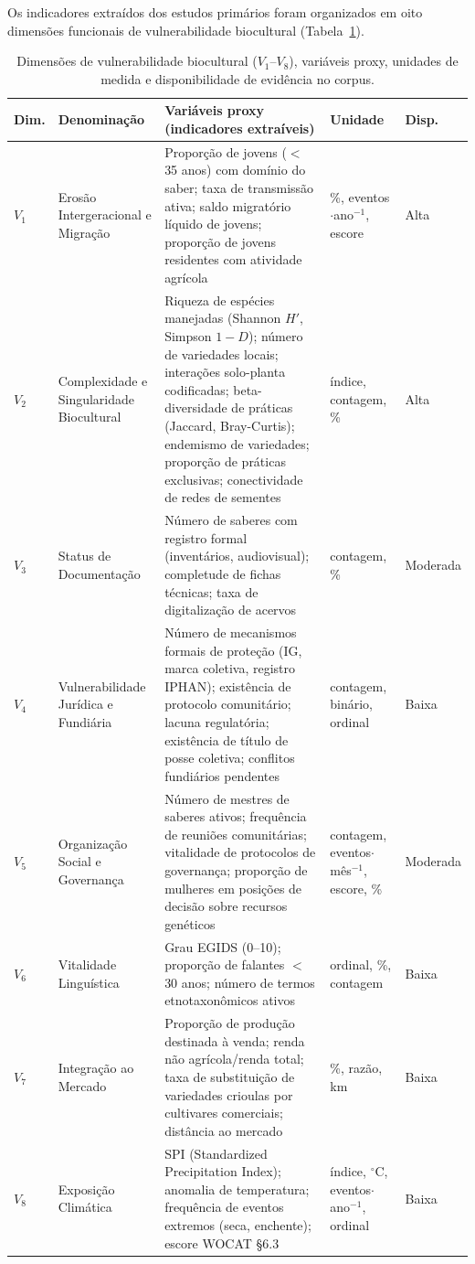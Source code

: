 Os indicadores extraídos dos estudos primários foram organizados em oito dimensões funcionais de vulnerabilidade biocultural (Tabela~\ref{tab:proxies_cap2}).

\begin{table}[htbp]
\caption{Dimensões de vulnerabilidade biocultural ($V_1$--$V_8$), variáveis proxy, unidades de medida e disponibilidade de evidência no corpus.}
\label{tab:proxies_cap2}
\centering
\footnotesize
\begin{tabular}{p{0.8cm}p{2.5cm}p{4.2cm}p{2.2cm}p{1.5cm}}
\toprule
\textbf{Dim.} & \textbf{Denominação} & \textbf{Variáveis proxy (indicadores extraíveis)} & \textbf{Unidade} & \textbf{Disp.} \\
\midrule
$V_1$ & Erosão Intergeracional e Migração & Proporção de jovens ($<$ 35 anos) com domínio do saber; taxa de transmissão ativa; saldo migratório líquido de jovens; proporção de jovens residentes com atividade agrícola & \%, eventos$\cdot$ano$^{-1}$, escore & Alta \\
\addlinespace
$V_2$ & Complexidade e Singularidade Biocultural & Riqueza de espécies manejadas (Shannon $H'$, Simpson $1-D$); número de variedades locais; interações solo-planta codificadas; beta-diversidade de práticas (Jaccard, Bray-Curtis); endemismo de variedades; proporção de práticas exclusivas; conectividade de redes de sementes & índice, contagem, \% & Alta \\
\addlinespace
$V_3$ & Status de Documentação & Número de saberes com registro formal (inventários, audiovisual); completude de fichas técnicas; taxa de digitalização de acervos & contagem, \% & Moderada \\
\addlinespace
$V_4$ & Vulnerabilidade Jurídica e Fundiária & Número de mecanismos formais de proteção (IG, marca coletiva, registro IPHAN); existência de protocolo comunitário; lacuna regulatória; existência de título de posse coletiva; conflitos fundiários pendentes & contagem, binário, ordinal & Baixa \\
\addlinespace
$V_5$ & Organização Social e Governança & Número de mestres de saberes ativos; frequência de reuniões comunitárias; vitalidade de protocolos de governança; proporção de mulheres em posições de decisão sobre recursos genéticos & contagem, eventos$\cdot$mês$^{-1}$, escore, \% & Moderada \\
\addlinespace
$V_6$ & Vitalidade Linguística & Grau EGIDS (0--10); proporção de falantes $<$ 30 anos; número de termos etnotaxonômicos ativos & ordinal, \%, contagem & Baixa \\
\addlinespace
$V_7$ & Integração ao Mercado & Proporção de produção destinada à venda; renda não agrícola/renda total; taxa de substituição de variedades crioulas por cultivares comerciais; distância ao mercado & \%, razão, km & Baixa \\
\addlinespace
$V_8$ & Exposição Climática & SPI (Standardized Precipitation Index); anomalia de temperatura; frequência de eventos extremos (seca, enchente); escore WOCAT §6.3 & índice, $^\circ$C, eventos$\cdot$ano$^{-1}$, ordinal & Baixa \\
\bottomrule
\end{tabular}
\end{table}

